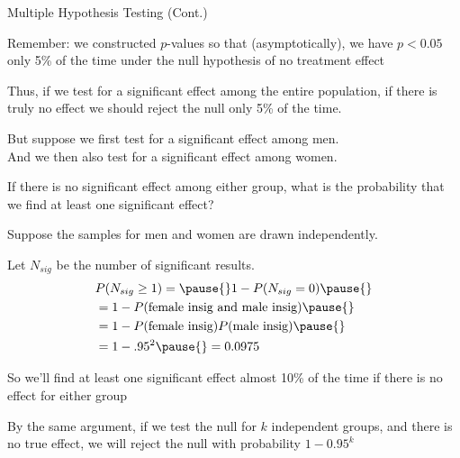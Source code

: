 \documentclass[11pt,english,handout]{beamer}
\newenvironment{wideitemize}{\itemize\addtolength{\itemsep}{10pt}}{\enditemize}
\begin{document}
\begin{frame}{Multiple Hypothesis Testing (Cont.)}
	\begin{wideitemize}
		\item
		Remember: we constructed $p$-values so that (asymptotically), we have $p<0.05$ only 5\% of the time under the null hypothesis of no treatment effect
		
		\pause
		\item
		Thus, if we test for a significant effect among the entire population, if there is truly no effect we should reject the null only 5\% of the time. 
		
		\pause
		\item
		But suppose we first test for a significant effect among men. \\
		And we then also test for a significant effect among women. 
		
		\pause
		\item
		If there is no significant effect among either group, what is the probability that we find at least one significant effect? 

	\end{wideitemize}
\end{frame}


\begin{frame}
	\begin{wideitemize}
		\item 
		Suppose the samples for men and women are drawn independently. 
		
		\item
		Let $N_{sig}$ be the number of significant results.
		\begin{align*}
		&P( N_{sig} \geq 1  ) = \pause{} 1 - P(N_{sig} =0)  \pause{} \\
		&= 1 - P(\text{female insig and male insig}) \pause{} \\
		& = 1 -P(\text{female insig}) P(\text{male insig}) \pause{} \\ 
		& = 1-.95^2 \pause{} =  0.0975
		\end{align*}
	
	\item
	So we'll find at least one significant effect almost 10\% of the time if there is no effect for either group
	
	\pause
	\item
	By the same argument, if we test the null for $k$ independent groups, and there is no true effect, we will reject the null with probability \pause $1 - 0.95^k$
\end{wideitemize}
\end{frame}
\end{document}
